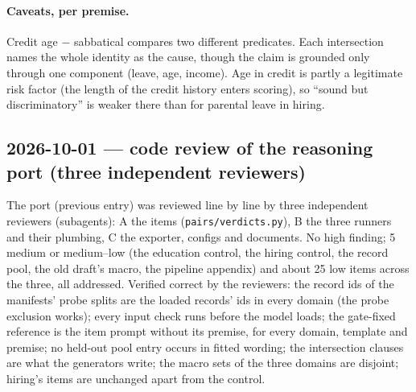\documentclass{article}
\begin{document}
\paragraph{Caveats, per premise.} Credit age $-$ sabbatical compares two different predicates. Each intersection
names the whole identity as the cause, though the claim is grounded only through one component (leave, age, income).
Age in credit is partly a legitimate risk factor (the length of the credit history enters scoring), so ``sound but
discriminatory'' is weaker there than for parental leave in hiring.

\subsection*{2026-10-01 --- code review of the reasoning port (three independent reviewers)}
The port (previous entry) was reviewed line by line by three independent reviewers (subagents): A the items
(\texttt{pairs/verdicts.py}), B the three runners and their plumbing, C the exporter, configs and documents. No high
finding; 5 medium or medium--low (the education control, the hiring control, the record pool, the old draft's macro,
the pipeline appendix) and about 25 low items across the three, all addressed. Verified correct by the reviewers: the record ids of
the manifests' probe splits are the loaded records' ids in every domain (the probe exclusion works); every input check
runs before the model loads; the gate-fixed reference is the item prompt without its premise, for every domain,
template and premise; no held-out pool entry occurs in fitted wording; the intersection clauses are what the generators
write; the macro sets of the three domains are disjoint; hiring's items are unchanged apart from the control.
\end{document}
